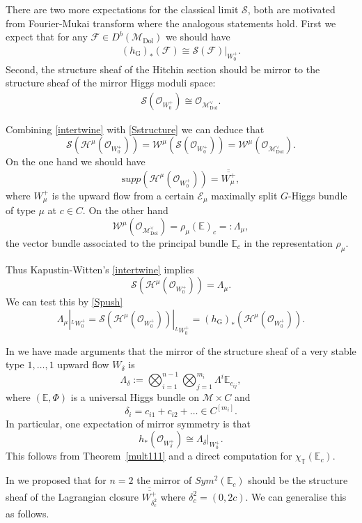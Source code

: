 \documentclass[12pt]{article}
\numberwithin{equation}{section}
\theoremstyle{remark}
\numberwithin{theorem}{section}
\def\beq{\begin{eqnarray}}
\def\eeq{\end{eqnarray}}
\def\calE{{\mathcal E}}
\def\bE{{\mathbb{E}}}
\def\bPhi{{\mathbb{\Phi}}}
\def\E{\mathbb{E}}
\def\M{{\mathcal{M}}}
\def\calF{{\mathcal{F}}}
\newcommand{\T}{{\mathbb{T}}}
\def\calO{{\mathcal O}}
\newcommand{\G}{\mathrm{G}}
\newcommand{\Dol}{{\mathrm{Dol}}}
\numberwithin{equation}{section}
\begin{document}
There are two more expectations for the classical limit $\mathscr{S}$, both are motivated from Fourier-Mukai transform where the analogous statements hold. First we  expect that for any $\calF\in D^b(\M_\Dol)$ we should have \beq \label{Spush} (h_\G)_*(\calF)\cong \mathscr{S}(\calF)|_{W^+_0}.\eeq Second, the structure sheaf of the Hitchin section should be mirror to the structure sheaf of the mirror Higgs moduli space: \beq \label{Sstructure}\mathscr{S}(\calO_{W^+_0})\cong \calO_{\M^\vee_{\Dol}} .\eeq

Combining \eqref{intertwine} with \eqref{Sstructure} we can deduce that $$\mathscr{S}(\mathscr{H}^\mu(\calO_{W^+_0}))=\mathscr{W}^\mu(\mathscr{S}(\calO_{W^+_0}))=\mathscr{W}^\mu(\calO_{\M^\vee_{\Dol}}).$$  On the one hand we should have $${\mathrm supp}(\mathscr{H}^\mu(\calO_{W^+_0}))=\overline{\overline{W^+_\mu}},$$ where $W_\mu^+$ is the upward flow from a certain $\calE_\mu$ maximally split $G$-Higgs bundle of type $\mu$ at $c\in C$. On the other hand $$\mathscr{W}^\mu(\calO_{\M^\vee_{\Dol}})=\rho_\mu(\bE)_c=:\Lambda_\mu,$$ the vector bundle associated  to the principal bundle $\bE_c$ in the representation $\rho_\mu$. 

Thus Kapustin-Witten's \eqref{intertwine} implies $$\mathscr{S}(\mathscr{H}^\mu(\calO_{W^+_0}))=\Lambda_\mu.$$ We can test this by \eqref{Spush}  $$\Lambda_\mu|_{ ^{L}W_0^+}= \mathscr{S}(\mathscr{H}^\mu(\calO_{W^+_0}))|_{ ^{L}W_0^+}=(h_\G)_*(\mathscr{H}^\mu(\calO_{W^+_0})).$$

In \cite{hausel-hitchin} we have made arguments that the mirror of the structure sheaf of a very stable type $1,\dots,1$ upward flow $W_{\delta}$ is $$\Lambda_\delta:=\bigotimes_{i=1}^{n-1} \bigotimes_{j=1}^{m_i} \Lambda^i\E_{c_{ij}},$$ where $(\E,\bPhi)$ is a universal Higgs bundle on $\M\times C$ and $$\delta_i=c_{i1}+{c_{i2}}+\dots \in C^{[m_i]}.$$ In particular, one expectation of mirror symmetry
is that $$h_*(\calO_{W^+_\delta})\cong \Lambda_\delta|_{W^+_0}.$$ This follows from Theorem~\ref{mult111} and a direct computation for $\chi_\T (\E_c)$.

In \cite[\S 8.2]{hausel-hitchin} we proposed that for $n=2$ the mirror of $Sym^2(\E_c)$ should be the structure sheaf of the Lagrangian closure $\overline{\overline{W^+_{\delta_{c}^2}}}$ where $\delta_{c}^2=(0,2c)$. We can generalise this as
follows. 
\end{document}
